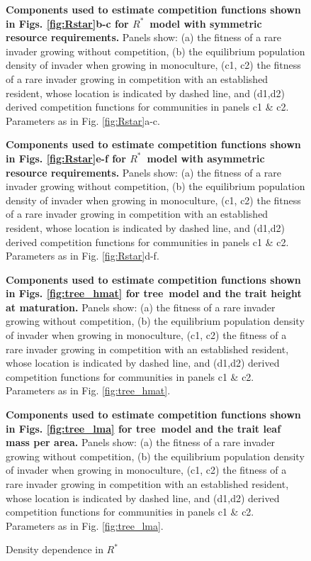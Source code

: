 \documentclass[a4paper,11pt]{article}
\newcommand{\Rstar}{\ensuremath{R^*}}
\newcommand{\TREE}{{\sc tree}}
\begin{document}
\begin{figure}[h]
 \centering
 \caption{\textbf{Components used to estimate competition functions shown in Figs.
 \ref{fig:Rstar}b-c for \Rstar\ model with symmetric resource requirements.}
  Panels show: (a) the fitness of a rare invader growing without competition,
  (b) the equilibrium population density of invader when growing in monoculture,
  (c1, c2) the fitness of a rare invader growing in competition with an established
  resident, whose location is indicated by dashed line, and (d1,d2) derived competition
  functions for communities in panels  c1 \& c2. Parameters as in Fig.
  \ref{fig:Rstar}a-c.
  \label{fig:sm_rstar_components1}}
\end{figure}

\begin{figure}[h]
 \centering
 \caption{\textbf{Components used to estimate competition functions shown in Figs.
 \ref{fig:Rstar}e-f for \Rstar\ model with asymmetric resource requirements.}
  Panels show: (a) the fitness of a rare invader growing without competition,
  (b) the equilibrium population density of invader when growing in monoculture,
  (c1, c2) the fitness of a rare invader growing in competition with an established
  resident, whose location is indicated by dashed line, and (d1,d2) derived competition
  functions for communities in panels c1 \& c2. Parameters as in Fig.
  \ref{fig:Rstar}d-f.
  \label{fig:sm_rstar_components2}}
\end{figure}

\begin{figure}[h]
 \centering
 \caption{\textbf{Components used to estimate competition functions shown in Figs.
 \ref{fig:tree_hmat} for \TREE\ model and the trait height at maturation.}
  Panels show: (a) the fitness of a rare invader growing without competition,
  (b) the equilibrium population density of invader when growing in monoculture,
  (c1, c2) the fitness of a rare invader growing in competition with an established
  resident, whose location is indicated by dashed line, and (d1,d2) derived competition
  functions for communities in panels c1 \& c2. Parameters as in Fig.
  \ref{fig:tree_hmat}.
  \label{fig:sm_tree_hmat_components}}
\end{figure}

\begin{figure}[h]
 \centering
 \caption{\textbf{Components used to estimate competition functions shown in Figs.
 \ref{fig:tree_lma} for \TREE\ model and the trait leaf mass per area.}
  Panels show: (a) the fitness of a rare invader growing without competition,
  (b) the equilibrium population density of invader when growing in monoculture,
  (c1, c2) the fitness of a rare invader growing in competition with an established
  resident, whose location is indicated by dashed line, and (d1,d2) derived competition
  functions for communities in panels  c1 \& c2. Parameters as in Fig.
  \ref{fig:tree_lma}.
  \label{fig:sm_tree_lma_components}}
\end{figure}

\begin{figure}[h]
  \centering
  \caption{Density dependence in \Rstar}
  \label{fig:rstar_density_dependence}
\end{figure}
\end{document}
